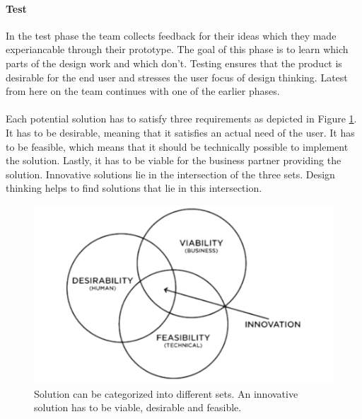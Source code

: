 \paragraph{Test}
In the test phase the team collects feedback for their ideas which they made experiancable through their prototype. The goal of this phase is to learn which parts of the design work and which don't.
Testing ensures that the product is desirable for the end user and stresses the user focus of design thinking.
Latest from here on the team continues with one of the earlier phases.

\paragraph{}
Each potential solution has to satisfy three requirements as depicted in Figure \ref{fig:desire_viable_feasible}. It has to be desirable, meaning that it satisfies an actual need of the user. It has to be feasible, which means that it should be technically possible to implement the solution. Lastly, it has to be viable for the business partner providing the solution.
Innovative solutions lie in the intersection of the three sets. Design thinking helps to find solutions that lie in this intersection.

\begin{figure}
\begin{centering}
    \includegraphics[width=0.5\linewidth]{images/desire_viable_feasible}
    \caption{Solution can be categorized into different sets. An innovative solution has to be viable, desirable and feasible.}
    \label{fig:desire_viable_feasible}
\end{centering}
\end{figure}